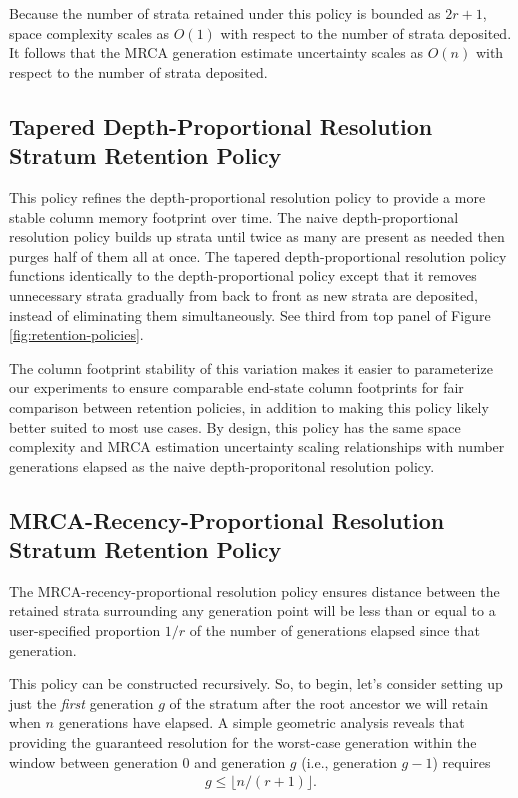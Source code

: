 Because the number of strata retained under this policy is bounded as $2r+1$, space complexity scales as $O(1)$ with respect to the number of strata deposited.
It follows that the MRCA generation estimate uncertainty scales as $O(n)$ with respect to the number of strata deposited.

\subsection{Tapered Depth-Proportional Resolution Stratum Retention Policy}

This policy refines the depth-proportional resolution policy to provide a more stable column memory footprint over time.
The naive depth-proportional resolution policy builds up strata until twice as many are present as needed then purges half of them all at once.
The tapered depth-proportional resolution policy functions identically to the depth-proportional policy except that it removes unnecessary strata gradually from back to front as new strata are deposited, instead of eliminating them simultaneously.
See third from top panel of Figure \ref{fig:retention-policies}.

The column footprint stability of this variation makes it easier to parameterize our experiments to ensure comparable end-state column footprints for fair comparison between retention policies, in addition to making this policy likely better suited to most use cases.
By design, this policy has the same space complexity and MRCA estimation uncertainty scaling relationships with number generations elapsed as the naive depth-proporitonal resolution policy.

\subsection{MRCA-Recency-Proportional Resolution Stratum Retention Policy}



The MRCA-recency-proportional resolution policy ensures distance between the retained strata surrounding any generation point will be less than or equal to a user-specified proportion $1/r$ of the number of generations elapsed since that generation.

This policy can be constructed recursively.
So, to begin, let's consider setting up just the \textit{first} generation $g$ of the stratum after the root ancestor we will retain when $n$ generations have elapsed.
A simple geometric analysis reveals that providing the guaranteed resolution for the worst-case generation within the window between generation 0 and generation $g$ (i.e., generation $g-1$) requires
\begin{align*}
  g \leq \lfloor n / (r + 1) \rfloor.
\end{align*}

